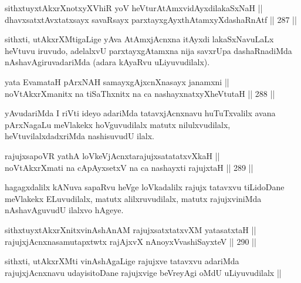 \begin{shl}
sithxtuyxtAkxrXnotxyXVhiR yoV heVturAtAmxvidAyxdilakaSxNaH || \\
dhavxsatxtAvxtatxsayx savaRsayx parxtayxgAyxthAtamxyXdashaRnAtf \hfill || 287 ||  
\end{shl}

\begin{artha}
sithxti, utAkxrXMtigaLige yAva AtAmxjAcnxna itAyxdi lakaSxNavuLaLx
heVtuvu iruvudo, adelalxvU parxtayxgAtamxna nija savxrUpa
dashaRnadiMda nAshavAgiruvadariMda (adara kAyaRvu uLiyuvudilalx).
\end{artha}

\begin{shl}
yata EvamataH pArxNAH samayxgAjxcnXnasayx janamxni || \\
noVtAkxrXmanitx na tiSaThxnitx na ca nashayxnatxyXheVtutaH \hfill || 288 ||  
\end{shl}

\begin{artha}
yAvudariMda I riVti ideyo adariMda tatavxjAcnxnavu huTuTxvalilx avana
pArxNagaLu meVlakekx hoVguvudilalx matutx nilulxvudilalx,
heVtuvilalxdadxriMda nashisuvudU ilalx.
\end{artha}

\begin{shl}
rajujxsapoVR yathA loVkeV\s jAcnxtarajujxsatatatxvXkaH || \\
noVtAkxrXmati na cApAyxsetxV na ca nashayxti rajujxtaH \hfill || 289 ||  
\end{shl}

\begin{artha}
hagagxdalilx kANuva sapaRvu heVge loVkadalilx rajujx tatavxvu
tiLidoDane meVlakekx ELuvudilalx, matutx alilxruvudilalx, matutx
rajujxviniMda nAshavAguvudU ilalxvo hAgeye.
\end{artha}

\begin{shl}
sithxtuyxtAkxrXnitxvinAshAnAM rajujxsatxtatxvXM yatasatxtaH || \\
rajujxjAcnxnasamutapxtwtx rajAjxvX nAnoyxV\s vashiSayxteV \hfill || 290 ||  
\end{shl}

\begin{artha}
sithxti, utAkxrXMti vinAshAgaLige rajujxve tatavxvu adariMda
rajujxjAcnxnavu udayisitoDane rajujxvige beVreyAgi oMdU uLiyuvudilalx ||
\end{artha}


